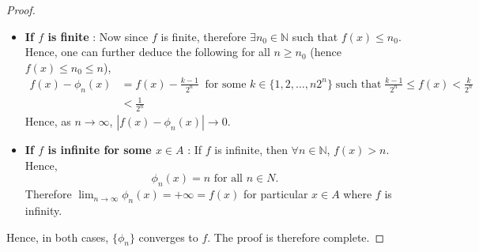 \documentclass{article}
\theoremstyle{definition}
\theoremstyle{remark}
\theoremstyle{definition}
\theoremstyle{definition}
\theoremstyle{definition}
\newcommand{\abs}[1]{\left \vert #1\right \vert}
\newcommand{\N}{\mathbb{N}}
\begin{document}
\begin{proof}
	\begin{itemize}
		\item {\textbf{If $ f $ is finite} : Now since $ f $ is finite, therefore $ \exists n_0 \in \N$ such that $ f(x)\le n_0 $. Hence, one can further deduce the following for all $ n\ge n_0 $ (hence $ f(x) \le n_0 \le n$),
			\begin{equation*}
				\begin{split}
					f(x) - \phi_n(x) &=  f(x) - \frac{k-1}{2^{n}}\;\;\text{for some }k\in\{1,2,\dots,n2^n\}\;\text{such that}\;\frac{k-1}{2^n}\le f(x)< \frac{k}{2^n}\\
					&<\frac{1}{2^n}
				\end{split}
			\end{equation*}
			Hence, as $ n\to \infty $, $ \abs{f(x) - \phi_n(x)} \to 0 $. 
		}
		\item {\textbf{If $ f $ is infinite for some $ x\in A $} : If $ f $ is infinite, then $ \forall n\in \N$, $ f(x) > n$. Hence,
			\[\phi_n(x) = n\text{ for all }n\in N.\]
			Therefore $ \lim_{n\to \infty} \phi_{n}(x) = +\infty = f(x) $ for particular $ x\in A $ where $ f $ is infinity.
		}
	\end{itemize}
	Hence, in both cases, $ \{\phi_n\} $ converges to $ f $. The proof is therefore complete.
\end{proof}
\hrulefill
\end{document}
